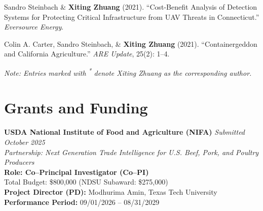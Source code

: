 \documentclass[10.5pt,letterpaper]{article}
\renewenvironment{itemize}{
	\begin{list}{}{
			\setlength{\leftmargin}{1.5em}
		}
	}{
	\end{list}
}
\begin{document}
\begin{itemize}
		\item[-] Sandro Steinbach \& \textbf{Xiting Zhuang} (2021).  
		``Cost-Benefit Analysis of Detection Systems for Protecting Critical Infrastructure from UAV Threats in Connecticut.''  
		\textit{Eversource Energy}.
		
		\item[-] Colin A. Carter, Sandro Steinbach, \& \textbf{Xiting Zhuang} (2021).  
		``Containergeddon and California Agriculture.''  
		\textit{ARE Update}, 25(2): 1–4.
	\end{itemize}
	
	
	
	
	
	\begin{footnotesize}
\textit{Note: Entries marked with \textsuperscript{*} denote Xiting Zhuang as the corresponding author.}


	\end{footnotesize}


\section*{\textbf{Grants and Funding}}

\begin{itemize}
	\item[-] \textbf{USDA National Institute of Food and Agriculture (NIFA)} \hfill \textit{Submitted October 2025} \\
	\textit{Partnership: Next Generation Trade Intelligence for U.S. Beef, Pork, and Poultry Producers} \\
	\textbf{Role: Co–Principal Investigator (Co–PI)} \\
	Total Budget: \$800,000 \hfill (NDSU Subaward: \$275,000) \\
	\textbf{Project Director (PD):} Modhurima Amin, Texas Tech University \\
	\textbf{Performance Period:} 09/01/2026 – 08/31/2029 \\
 

\end{itemize}







\end{document}
